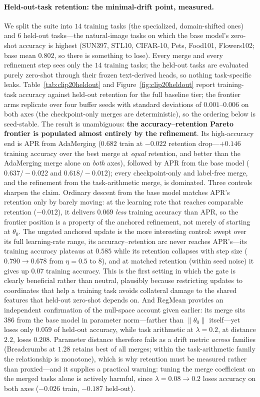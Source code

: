 \documentclass[11pt]{article}
\begin{document}
\paragraph{Held-out-task retention: the minimal-drift point, measured.}
We split the suite into $14$ training tasks (the specialized, domain-shifted ones) and $6$ held-out tasks---the natural-image tasks on which the base model's zero-shot accuracy is highest (SUN397, STL10, CIFAR-10, Pets, Food101, Flowers102; base mean $0.802$, so there is something to lose). Every merge and every refinement step sees only the $14$ training tasks; the held-out tasks are evaluated purely zero-shot through their frozen text-derived heads, so nothing task-specific leaks. Table~\ref{tab:clip20heldout} and Figure~\ref{fig:clip20heldout} report training-task accuracy against held-out retention for the full baseline tier; the frontier arms replicate over four buffer seeds with standard deviations of $0.001$--$0.006$ on both axes (the checkpoint-only merges are deterministic), so the ordering below is seed-stable. The result is unambiguous: \textbf{the accuracy--retention Pareto frontier is populated almost entirely by the refinement}. Its high-accuracy end is APR from AdaMerging ($0.682$ train at $-0.022$ retention drop---$+0.146$ training accuracy over the best merge at \emph{equal} retention, and better than the AdaMerging merge alone on \emph{both} axes), followed by APR from the base model ($0.637/-0.022$ and $0.618/-0.012$); every checkpoint-only and label-free merge, and the refinement from the task-arithmetic merge, is dominated. Three controls sharpen the claim. Ordinary descent from the base model matches APR's retention only by barely moving: at the learning rate that reaches comparable retention ($-0.012$), it delivers $0.069$ \emph{less} training accuracy than APR, so the frontier position is a property of the anchored refinement, not merely of starting at $\theta_0$. The ungated anchored update is the more interesting control: swept over its full learning-rate range, its accuracy--retention arc never reaches APR's---its training accuracy plateaus at $0.585$ while its retention collapses with step size ($0.790\!\to\!0.678$ from $\eta=0.5$ to $8$), and at matched retention (within seed noise) it gives up $0.07$ training accuracy. This is the first setting in which the gate is clearly beneficial rather than neutral, plausibly because restricting updates to coordinates that help a training task avoids collateral damage to the shared features that held-out zero-shot depends on. And RegMean provides an independent confirmation of the null-space account given earlier: its merge sits $386$ from the base model in parameter norm---farther than $\lVert\theta_0\rVert$ itself---yet loses only $0.059$ of held-out accuracy, while task arithmetic at $\lambda=0.2$, at distance $2.2$, loses $0.208$. Parameter distance therefore fails as a drift metric \emph{across} families (Breadcrumbs at $1.28$ retains best of all merges; within the task-arithmetic family the relationship is monotone), which is why retention must be measured rather than proxied---and it supplies a practical warning: tuning the merge coefficient on the merged tasks alone is actively harmful, since $\lambda\!=\!0.08\!\to\!0.2$ loses accuracy on both axes ($-0.026$ train, $-0.187$ held-out).
\end{document}
